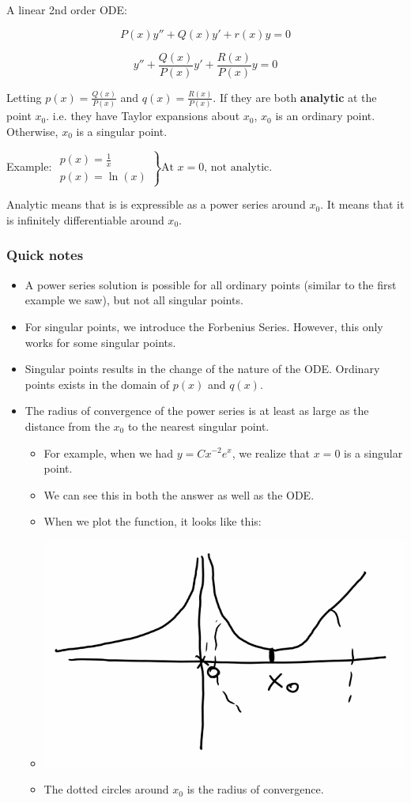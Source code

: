 A linear 2nd order ODE:

$$P(x) y'' + Q(x) y' + r(x) y = 0$$

$$y'' + \frac{Q(x)}{P(x)} y' + \frac{R(x)}{P(x)} y = 0$$

Letting $p(x) = \frac{Q(x)}{P(x)}$ and $q(x) = \frac{R(x)}{P(x)}$. If they are both \textbf{analytic} at the point $x_0$. i.e. they have Taylor expansions about $x_0$, $x_0$ is an ordinary point. Otherwise, $x_0$ is a singular point. 

Example: $\left. \begin{matrix} p(x) = \frac{1}{x} \\ p(x) = \ln(x) \end{matrix} \right\} \text{At } x = 0 \text{, not analytic}$.

Analytic means that is is expressible as a power series around $x_0$. It means that it is infinitely differentiable around $x_0$. 

\subsubsection{Quick notes}

\begin{itemize}
    \item A power series solution is possible for all ordinary points (similar to the first example we saw), but not all singular points. 
    \item For singular points, we introduce the Forbenius Series. However, this only works for some singular points. 
    \item Singular points results in the change of the nature of the ODE. Ordinary points exists in the domain of $p(x)$ and $q(x)$. 
    \item The radius of convergence of the power series is at least as large as the distance from the $x_0$ to the nearest singular point.
    \begin{itemize}
        \item For example, when we had $y = C x^{-2} e^x$, we realize that $x=  0$ is a singular point. 
        \item We can see this in both the answer as well as the ODE. \item When we plot the function, it looks like this:
        \item \includegraphics[width = 0.5 \textwidth]{image6.png}
        \item The dotted circles around $x_0$ is the radius of convergence. 
    \end{itemize}
\end{itemize}

